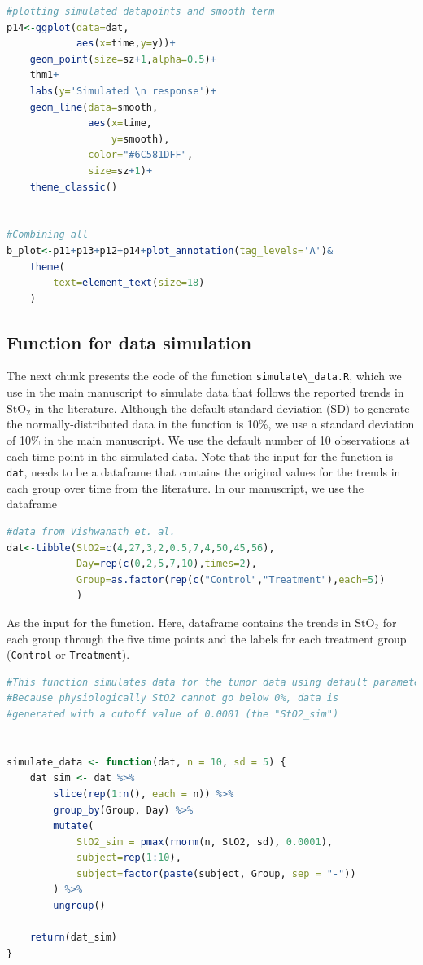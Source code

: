 \documentclass[
]{article}
\newcommand{\passthrough}[1]{#1}
\begin{document}
\begin{lstlisting}[language=R]
#plotting simulated datapoints and smooth term
p14<-ggplot(data=dat,
            aes(x=time,y=y))+
    geom_point(size=sz+1,alpha=0.5)+
    thm1+
    labs(y='Simulated \n response')+
    geom_line(data=smooth,
              aes(x=time,
                  y=smooth),
              color="#6C581DFF",
              size=sz+1)+
    theme_classic()


#Combining all
b_plot<-p11+p13+p12+p14+plot_annotation(tag_levels='A')&
    theme(
        text=element_text(size=18)
    )
\end{lstlisting}

\hypertarget{function-for-data-simulation}{%
\subsection{Function for data simulation}\label{function-for-data-simulation}}

The next chunk presents the code of the function \passthrough{\lstinline!simulate\_data.R!}, which we use in the main manuscript to simulate data that follows the reported trends in \(\mbox{StO}_2\) in the literature. Although the default standard deviation (SD) to generate the normally-distributed data in the function is 10\%, we use a standard deviation of 10\% in the main manuscript. We use the default number of 10 observations at each time point in the simulated data. Note that the input for the function is \passthrough{\lstinline!dat!}, needs to be a dataframe that contains the original values for the trends in each group over time from the literature. In our manuscript, we use the dataframe

\begin{lstlisting}[language=R]
#data from Vishwanath et. al.
dat<-tibble(StO2=c(4,27,3,2,0.5,7,4,50,45,56),
            Day=rep(c(0,2,5,7,10),times=2),
            Group=as.factor(rep(c("Control","Treatment"),each=5))
            )
\end{lstlisting}

As the input for the function. Here, dataframe contains the trends in \(\mbox{StO}_2\) for each group through the five time points and the labels for each treatment group (\passthrough{\lstinline!Control!} or \passthrough{\lstinline!Treatment!}).

\begin{lstlisting}[language=R]
#This function simulates data for the tumor data using default parameters of 10 observations per time point,and Standard deviation (sd) of 5%.
#Because physiologically StO2 cannot go below 0%, data is
#generated with a cutoff value of 0.0001 (the "StO2_sim")


simulate_data <- function(dat, n = 10, sd = 5) {
    dat_sim <- dat %>%
        slice(rep(1:n(), each = n)) %>%
        group_by(Group, Day) %>%
        mutate(
            StO2_sim = pmax(rnorm(n, StO2, sd), 0.0001),
            subject=rep(1:10),
            subject=factor(paste(subject, Group, sep = "-"))
        ) %>%
        ungroup()

    return(dat_sim)
}
\end{lstlisting}
\end{document}
